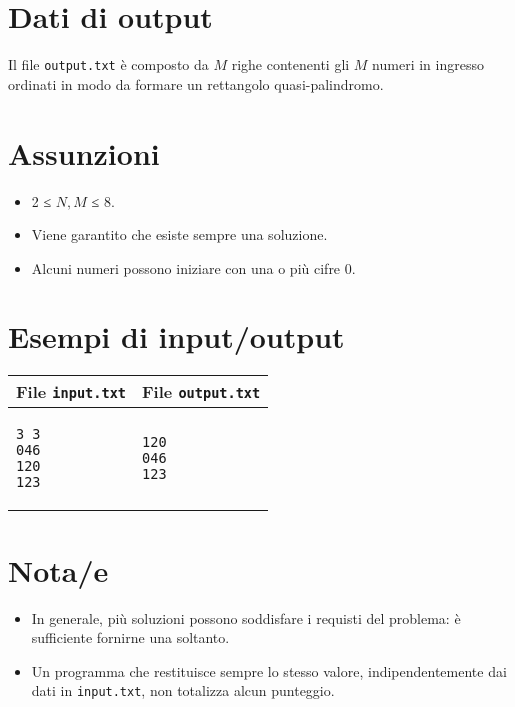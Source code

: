 \documentclass[a4paper,11pt]{article}
\begin{document}
\section*{Dati di output}
  
Il file \texttt{output.txt} è composto da $M$ righe
contenenti gli $M$ numeri in ingresso ordinati in modo
da formare un rettangolo quasi-palindromo.

  \section*{Assunzioni}
  \begin{itemize}
  
    \item  2 ≤ $N, M$ ≤ 8.
    \item  Viene garantito che esiste sempre una soluzione.
    \item  Alcuni numeri possono iniziare con una o più cifre 0.
  \end{itemize}

\section*{Esempi di input/output}

  
    \noindent
    \begin{tabular}{p{11cm}|p{5cm}}
    \toprule
    \textbf{File \texttt{input.txt}}
    & \textbf{File \texttt{output.txt}}
    \\
    \midrule
    \scriptsize
    \begin{verbatim}
3 3 
046
120
123 
\end{verbatim}
    &
    \scriptsize
    \begin{verbatim}
120
046
123 
\end{verbatim}
    \\
    \bottomrule
    \end{tabular}
  
\section*{Nota/e}
\begin{itemize}
  
    \item In generale, più soluzioni possono soddisfare i requisti del
problema: è sufficiente fornirne una soltanto.
    \item Un programma che restituisce sempre lo stesso valore,
indipendentemente dai dati in \texttt{input.txt}, non totalizza
alcun punteggio.
\end{itemize}
\end{document}
